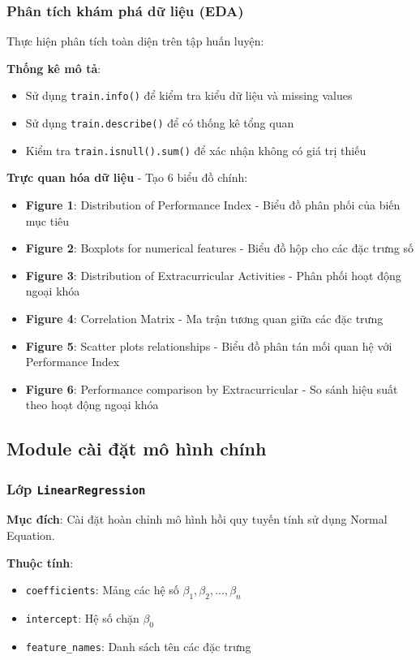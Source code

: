 \subsubsection{Phân tích khám phá dữ liệu (EDA)}
Thực hiện phân tích toàn diện trên tập huấn luyện:

\textbf{Thống kê mô tả}:
\begin{itemize}
	\item Sử dụng \texttt{train.info()} để kiểm tra kiểu dữ liệu và missing values
	\item Sử dụng \texttt{train.describe()} để có thống kê tổng quan
	\item Kiểm tra \texttt{train.isnull().sum()} để xác nhận không có giá trị thiếu
\end{itemize}

\textbf{Trực quan hóa dữ liệu} - Tạo 6 biểu đồ chính:
\begin{itemize}
	\item \textbf{Figure 1}: Distribution of Performance Index - Biểu đồ phân phối của biến mục tiêu
	\item \textbf{Figure 2}: Boxplots for numerical features - Biểu đồ hộp cho các đặc trưng số
	\item \textbf{Figure 3}: Distribution of Extracurricular Activities - Phân phối hoạt động ngoại khóa
	\item \textbf{Figure 4}: Correlation Matrix - Ma trận tương quan giữa các đặc trưng
	\item \textbf{Figure 5}: Scatter plots relationships - Biểu đồ phân tán mối quan hệ với Performance Index
	\item \textbf{Figure 6}: Performance comparison by Extracurricular - So sánh hiệu suất theo hoạt động ngoại khóa
\end{itemize}

\subsection{Module cài đặt mô hình chính}

\subsubsection{Lớp \texttt{LinearRegression}}
\textbf{Mục đích}: Cài đặt hoàn chỉnh mô hình hồi quy tuyến tính sử dụng Normal Equation.

\textbf{Thuộc tính}:
\begin{itemize}
	\item \texttt{coefficients}: Mảng các hệ số \(\beta_1, \beta_2, ..., \beta_n\)
	\item \texttt{intercept}: Hệ số chặn \(\beta_0\)
	\item \texttt{feature\_names}: Danh sách tên các đặc trưng
\end{itemize}

